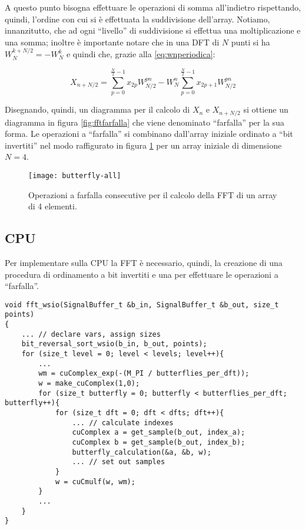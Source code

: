 A questo punto bisogna effettuare le operazioni di somma all'indietro rispettando, quindi, l'ordine con cui si è effettuata la suddivisione dell'array. Notiamo, innanzitutto, che ad ogni ``livello'' di suddivisione si effettua una moltiplicazione e una somma; inoltre è importante notare che in una DFT di $N$ punti si ha $W_N^{k+N/2} = -W_N^k$ e quindi che, grazie alla \ref{eq:wnperiodica}:

\begin{equation}
    X_{n+N/2} = \displaystyle\sum_{p=0}^{\frac{N}{2}-1}x_{2p} W_{N/2}^{pn} - W_N^{n}\displaystyle\sum_{p=0}^{\frac{N}{2}-1}x_{2p+1} W_{N/2}^{pn}
\end{equation}

Disegnando, quindi, un diagramma per il calcolo di $X_n$ e $X_{n+N/2}$ si ottiene un diagramma in figura \ref{fig:fftfarfalla} che viene denominato ``farfalla'' per la sua forma. Le operazioni a ``farfalla'' si combinano dall'array iniziale ordinato a ``bit invertiti'' nel modo raffigurato in figura \ref{fig:fftfarfalle} per un array iniziale di dimensione $N=4$.

\begin{figure}[h]
    \centering
    \texttt{[image: butterfly-all]}
    \caption{Operazioni a farfalla consecutive per il calcolo della FFT di un array di 4 elementi.}
    \label{fig:fftfarfalle}
\end{figure}


\subsection{CPU}
Per implementare sulla CPU la FFT è necessario, quindi, la creazione di una procedura di ordinamento a bit invertiti e una per effettuare le operazioni a ``farfalla''.

\begin{lstlisting}
void fft_wsio(SignalBuffer_t &b_in, SignalBuffer_t &b_out, size_t points)
{
    ... // declare vars, assign sizes
    bit_reversal_sort_wsio(b_in, b_out, points);
    for (size_t level = 0; level < levels; level++){
        ...
        wm = cuComplex_exp(-(M_PI / butterflies_per_dft));
        w = make_cuComplex(1,0);
        for (size_t butterfly = 0; butterfly < butterflies_per_dft; butterfly++){
            for (size_t dft = 0; dft < dfts; dft++){
                ... // calculate indexes
                cuComplex a = get_sample(b_out, index_a);
                cuComplex b = get_sample(b_out, index_b);
                butterfly_calculation(&a, &b, w);
                ... // set out samples
            }
            w = cuCmulf(w, wm);
        }
        ...
    }
}
\end{lstlisting}

